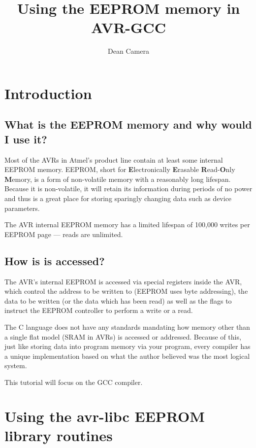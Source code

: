 \documentclass[a4paper,oneside,notitlepage]{book}
\begin{document}
\title{Using the EEPROM memory in AVR-GCC}
\author{Dean Camera}
\maketitle



\cleardoublepage
\tableofcontents
\cleardoublepage


\chapter{Introduction}

\section{What is the EEPROM memory and why would I use it?}

Most of the AVRs in Atmel's product line contain at least some internal EEPROM memory. EEPROM, short for \textbf{E}lectronically \textbf{E}rasable \textbf{R}ead-\textbf{O}nly \textbf{M}emory, is a form of non-volatile memory with a reasonably long lifespan. Because it is non-volatile, it will retain its information during periods of no power and thus is a great place for storing sparingly changing data such as device parameters.

The AVR internal EEPROM memory has a limited lifespan of 100,000 writes per EEPROM page --- reads are unlimited.

\section{How is is accessed?}

The AVR's internal EEPROM is accessed via special registers inside the AVR, which control the address to be written to (EEPROM uses byte addressing), the data to be written (or the data which has been read) as well as the flags to instruct the EEPROM controller to perform a write or a read.

The C language does not have any standards mandating how memory other than a single flat model (SRAM in AVRs) is accessed or addressed. Because of this, just like storing data into program memory via your program, every compiler has a unique implementation based on what the author believed was the most logical system.

This tutorial will focus on the GCC compiler.


\chapter{Using the avr-libc EEPROM library routines}
\end{document}

